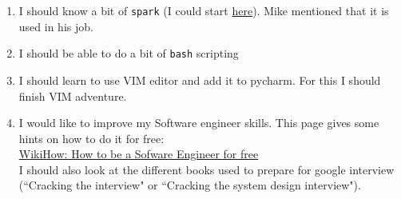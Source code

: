 \documentclass[11pt,a4paper]{article}
\begin{document}
\begin{enumerate}
\item I should know a bit of \texttt{spark} (I could start \href{https://www.kdnuggets.com/2015/11/introduction-spark-python.html}{here}). Mike mentioned that it is used in his job.
\item I should be able to do a bit of \texttt{bash} scripting
\item I should learn to use VIM editor and add it to pycharm. For this I should finish VIM adventure.
\item I would like to improve my Software engineer skills. This page gives some hints on how to do it for free:\\
\href{https://www.wikihow.com/Learn-How-to-Be-a-Software-Engineer-for-Free#}{WikiHow: How to be a Sofware Engineer for free}\\
I should also look at the different books used to prepare for google interview (``Cracking the interview" or ``Cracking the system design interview").
\end{enumerate}
\end{document}
